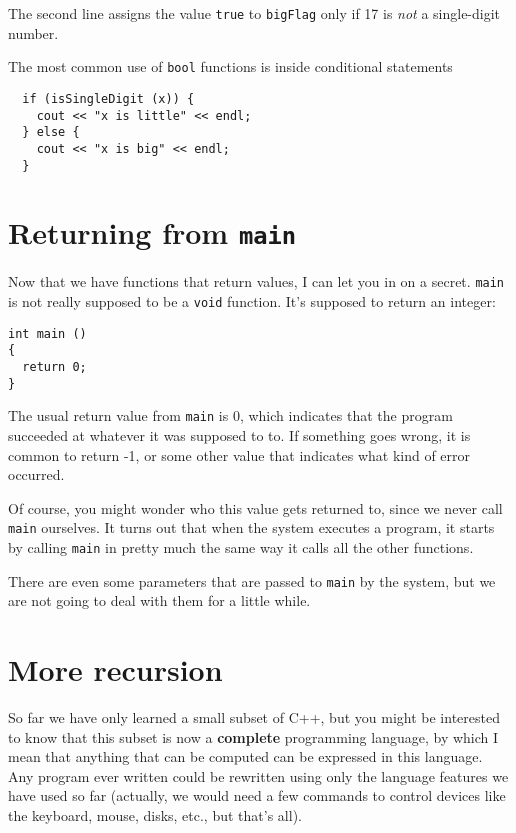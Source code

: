 The second line assigns the value {\tt true} to {\tt bigFlag}
only if 17 is {\em not} a single-digit number.

The most common use of {\tt bool} functions is inside conditional
statements

\begin{verbatim}
  if (isSingleDigit (x)) {
    cout << "x is little" << endl;
  } else {
    cout << "x is big" << endl;
  }
\end{verbatim}

\section {Returning from {\tt main}}

Now that we have functions that return values, I can let you in
on a secret.  {\tt main} is not really supposed to be a {\tt void}
function.  It's supposed to return an integer:

\begin{verbatim}
int main ()
{
  return 0;
}  
\end{verbatim}
%
The usual return value from {\tt main} is 0, which indicates that
the program succeeded at whatever it was supposed to to.  If something
goes wrong, it is common to return -1, or some other value that
indicates what kind of error occurred.

Of course, you might wonder who this value gets returned to, since
we never call {\tt main} ourselves.  It turns out that when the
system executes a program, it starts by calling {\tt main}
in pretty much the same way it calls all the other functions.

There are even some parameters that are passed to {\tt main}
by the system, but we are not going to deal with them for a little
while.

\section {More recursion}

So far we have only learned a small subset of C++, but you
might be interested to know that this subset is now
a {\bf complete} programming language, by which I
mean that anything that can be computed can be expressed in this
language.  Any program ever written could be rewritten
using only the language features we have used so far (actually, we
would need a few commands to control devices like the keyboard, mouse,
disks, etc., but that's all).

